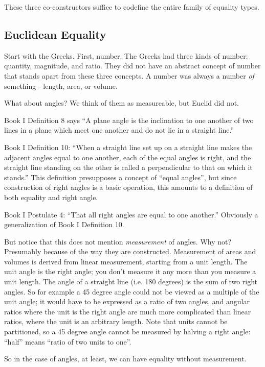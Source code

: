 These three co-constructors suffice to codefine the entire family of
equality types.

\subsection{Euclidean Equality \\}

Start with the Greeks. First, number. The Greeks had three kinds of
number: quantity, magnitude, and ratio. They did not have an abstract
concept of number that stands apart from these three concepts. A
number was always a number \textit{of} something - length, area, or
volume.

What about angles? We think of them as measureable, but Euclid did
not.

Book I Definition 8 says \enquote{A plane angle is the
  inclination to one another of two lines in a plane which meet one
  another and do not lie in a straight line.}

Book I Definition 10: \enquote{When a straight line set up on a
  straight line makes the adjacent angles equal to one another, each
  of the equal angles is right, and the straight line standing on the
  other is called a perpendicular to that on which it stands.} This
definition presupposes a concept of ``equal angles'', but since
construction of right angles is a basic operation, this amounts to a
definition of both equality and right angle.

Book I Postulate 4: \enquote{That all right angles are equal to one another.}
Obviously a generalization of Book I Definition 10.

But notice that this does not mention \textit{measurement} of angles.
Why not? Presumably because of the way they are constructed.
Measurement of areas and volumes is derived from linear measurement,
starting from a unit length. The unit angle is the right angle; you
don't measure it any more than you measure a unit length. The angle of
a straight line (i.e. 180 degrees) is the sum of two right angles. So
for example a 45 degree angle could not be viewed as a multiple of the
unit angle; it would have to be expressed as a ratio of two angles,
and angular ratios where the unit is the right angle are much more
complicated than linear ratios, where the unit is an arbitrary length.
Note that units cannot be partitioned, so a 45 degree angle cannot be
measured by halving a right angle: ``half'' means ``ratio of two units
to one''.

So in the case of angles, at least, we can have equality without measurement.


